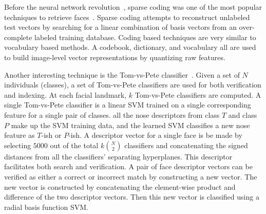         Before the neural network revolution~\cite{krizhevsky_imagenet_2012}, sparse coding was one of the most
        popular techniques to retrieve faces~\cite{aharon_k_svd_2006, wright_robust_2009, zhang_sparse_2011,
        jiang_label_2013}. Sparse coding attempts to reconstruct unlabeled test vectors by searching for a linear
        combination of basis vectors from an over-complete labeled training database. Coding based techniques are
        very similar to vocabulary based methods. A codebook, dictionary, and vocabulary all are used to build
        image-level vector representations by quantizing raw features.

        Another interesting technique is the Tom-vs-Pete classifier~\cite{berg_tom_vs_pete_2012}. Given a set of $N$
        individuals (classes), a set of Tom-vs-Pete classifiers are used for both verification and indexing. At
        each facial landmark, $k$ Tom-vs-Pete classifiers are computed. A single Tom-vs-Pete classifier is a linear
        SVM trained on a single corresponding feature for a single pair of classes. \Eg{} all the nose
        descriptors from class $T$ and class $P$ make up the SVM training data, and the learned SVM classifies a
        new nose feature as $T$-ish or $P$-ish. A descriptor vector for a single face is be made by selecting
        $5000$ out of the total $k\binom{N}{2}$ classifiers and concatenating the signed distances from all the
        classifiers' separating hyperplanes. This descriptor facilitates both search and verification. A pair of
        face descriptor vectors can be verified as either a correct or incorrect match by constructing a new
        vector. The new vector is constructed by concatenating the element-wise product and difference of the two
        descriptor vectors. Then this new vector is classified using a radial basis function SVM{}.

